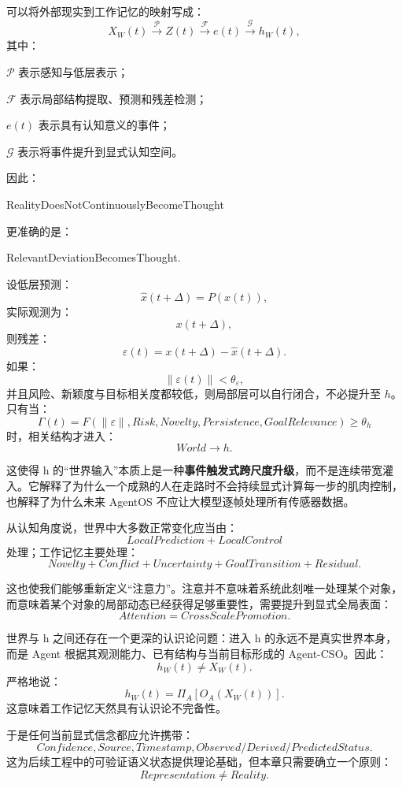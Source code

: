 可以将外部现实到工作记忆的映射写成：
\[
X_W(t)
\xrightarrow{\mathcal P}
Z(t)
\xrightarrow{\mathcal F}
e(t)
\xrightarrow{\mathcal G}
h_W(t),
\]
其中：

$\mathcal P$ 表示感知与低层表示；

$\mathcal F$ 表示局部结构提取、预测和残差检测；

$e(t)$ 表示具有认知意义的事件；

$\mathcal G$ 表示将事件提升到显式认知空间。

因此：
\begin{statementbox}
RealityDoesNotContinuouslyBecomeThought
\end{statementbox}
更准确的是：
\begin{statementbox}
RelevantDeviationBecomesThought.
\end{statementbox}

设低层预测：
\[
\hat x(t+\Delta)
=
P(x(t)),
\]
实际观测为：
\[
x(t+\Delta),
\]
则残差：
\[
\varepsilon(t)
=
x(t+\Delta)-\hat x(t+\Delta).
\]
如果：
\[
\|\varepsilon(t)\|<\theta_\varepsilon,
\]
并且风险、新颖度与目标相关度都较低，则局部层可以自行闭合，不必提升至 $h$。只有当：
\[
\Gamma(t)
=
F
\left(
\|\varepsilon\|,
Risk,
Novelty,
Persistence,
GoalRelevance
\right)
\geq
\theta_h
\]
时，相关结构才进入：
\[
World\rightarrow h.
\]

这使得 h 的“世界输入”本质上是一种\textbf{事件触发式跨尺度升级}，而不是连续带宽灌入。它解释了为什么一个成熟的人在走路时不会持续显式计算每一步的肌肉控制，也解释了为什么未来 AgentOS 不应让大模型逐帧处理所有传感器数据。

从认知角度说，世界中大多数正常变化应当由：
\[
LocalPrediction
+
LocalControl
\]
处理；工作记忆主要处理：
\[
Novelty
+
Conflict
+
Uncertainty
+
GoalTransition
+
Residual.
\]

这也使我们能够重新定义“注意力”。注意并不意味着系统此刻唯一处理某个对象，而意味着某个对象的局部动态已经获得足够重要性，需要提升到显式全局表面：
\[
\boxed{
Attention
=
CrossScalePromotion.
}
\]

世界与 h 之间还存在一个更深的认识论问题：进入 h 的永远不是真实世界本身，而是 Agent 根据其观测能力、已有结构与当前目标形成的 Agent-CSO。因此：
\[
h_W(t)
\neq
X_W(t).
\]
严格地说：
\[
h_W(t)
=
\Pi_A
\left[
O_A(X_W(t))
\right].
\]
这意味着工作记忆天然具有认识论不完备性。

于是任何当前显式信念都应允许携带：
\[
Confidence,
Source,
Timestamp,
Observed/Derived/PredictedStatus.
\]
这为后续工程中的可验证语义状态提供理论基础，但本章只需要确立一个原则：
\[
\boxed{
Representation\neq Reality.
}
\]

